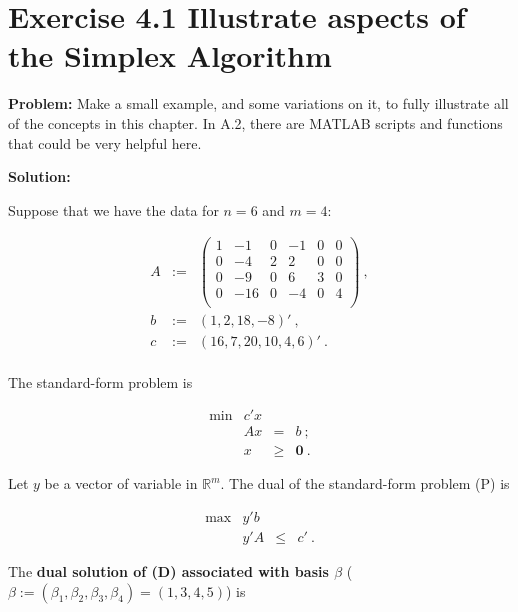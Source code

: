 
\section{Exercise 4.1 Illustrate aspects of the Simplex Algorithm}
\textbf{Problem:} Make a small example, and some variations on it, to fully illustrate all of the concepts in this chapter. In A.2, there are MATLAB scripts and functions that could be very helpful here.

\textbf{Solution:}

Suppose that we have the data for $n=6$ and $m=4$:

\[
\begin{array}{ccl}
A & := & \left(
  \begin{array}{cccccc}
    1 & -1 & 0 & -1 & 0 & 0 \\
    0 & -4 & 2 & 2 & 0 & 0 \\
    0 & -9 & 0 & 6 & 3 & 0 \\
    0 & -16 & 0 & -4 & 0 & 4 \\
  \end{array}
\right)~, \\
b & := & (1,2,18,-8)'~,\\
c & := & (16, 7, 20, 10, 4, 6)'~.\\

\end{array}
\]

The standard-form problem is 

\[
\tag{P}
\begin{array}{rrcl}
 \min & c'x  &      &   \\
      &  Ax  &   =  & b~; \\
      &   x  & \geq & \mathbf{0}~.
\end{array}
\]

Let $y$ be a vector of variable in $\mathbb{R}^m$. The dual of the standard-form problem (P) is

\[
\begin{array}{rrcl}
 \max & y'b  &      &   \\
      &  y'A  &   \leq  & c'~.
\end{array}
\tag{D}
\]

The \textbf{ dual solution of (D) associated with basis $\beta$} ($\beta := (\beta_1, \beta_2, \beta_3, \beta_4) = (1,3,4,5)$) is

